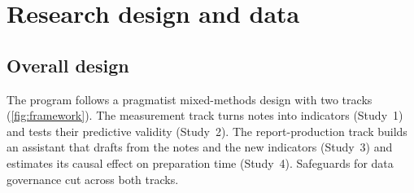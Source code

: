 \documentclass[11pt]{article}
\begin{document}
\section{Research design and data}\label{sec:design}

\subsection{Overall design}
The program follows a pragmatist mixed-methods design with two tracks (\cref{fig:framework}). The measurement track turns notes into indicators (Study~1) and tests their predictive validity (Study~2). The report-production track builds an assistant that drafts from the notes and the new indicators (Study~3) and estimates its causal effect on preparation time (Study~4). Safeguards for data governance cut across both tracks.
\end{document}
